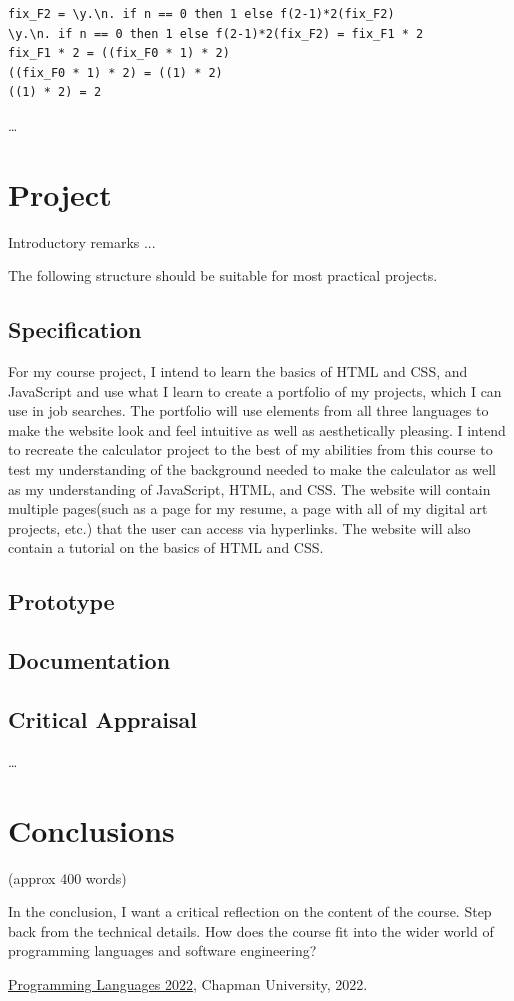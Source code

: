 \documentclass{article}
\theoremstyle{theorem}
\theoremstyle{definition}
\theoremstyle{remark}
\begin{document}
\begin{verbatim}
fix_F2 = \y.\n. if n == 0 then 1 else f(2-1)*2(fix_F2)
\y.\n. if n == 0 then 1 else f(2-1)*2(fix_F2) = fix_F1 * 2
fix_F1 * 2 = ((fix_F0 * 1) * 2)
((fix_F0 * 1) * 2) = ((1) * 2)
((1) * 2) = 2
\end{verbatim}

\ldots

\section{Project}

Introductory remarks ...

The following structure should be suitable for most practical projects. 

\subsection{Specification}

For my course project, I intend to learn the basics of HTML and CSS, and JavaScript and use what I learn to create a portfolio of my projects, which I can use in job searches. The portfolio will use elements from all three languages to make the website look and feel intuitive as well as aesthetically pleasing. I intend to recreate the calculator project to the best of my abilities from this course to test my understanding of the background needed to make the calculator as well as my understanding of JavaScript, HTML, and CSS. The website will contain multiple pages(such as a page for my resume, a page with all of my digital art projects, etc.) that the user can access via hyperlinks. The website will also contain a tutorial on the basics of HTML and CSS.

\subsection{Prototype}
\subsection{Documentation}
\subsection{Critical Appraisal}

\ldots

\section{Conclusions}\label{conclusions}

(approx 400 words)

In the conclusion, I want a critical reflection on the content of the course. Step back from the technical details. How does the course fit into the wider world of programming languages and software engineering?

\begin{thebibliography}{99}
 \href{https://github.com/alexhkurz/programming-languages-2022/blob/main/README.md}{Programming Languages 2022}, Chapman University, 2022.
\end{thebibliography}
\end{document}
